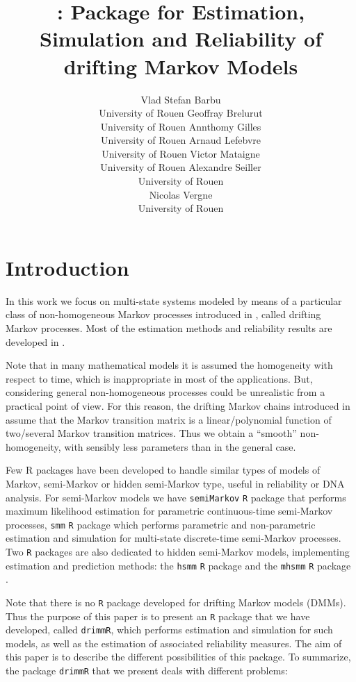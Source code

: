 \documentclass[article,nojss]{jss}\usepackage[]{graphicx}\usepackage[]{color}
\author{
Vlad Stefan Barbu\\University of Rouen \And Geoffray Brelurut\\University of Rouen \And Annthomy Gilles\\University of Rouen
\AND Arnaud Lefebvre\\University of Rouen \And Victor Mataigne \\University of Rouen \And Alexandre Seiller \\University of Rouen \\ \And Nicolas Vergne\\University of Rouen \\
}
\title{\pkg{drimmR} : \proglang{R} Package for Estimation, Simulation and Reliability of drifting Markov Models}%
\begin{document}
\section{Introduction}

In this work we focus on multi-state systems modeled by means of a particular class of non-homogeneous Markov processes introduced in \citet{Ver08}, called drifting Markov processes. Most of the estimation methods and reliability results are developed in \cite{BaVe2018}.

Note that in many mathematical models it is assumed the homogeneity with respect to time, which is inappropriate in most of the applications. But, considering general non-homogeneous processes could be unrealistic from a practical point of view. For this reason, the drifting Markov chains introduced in  \cite{Ver08} assume that the Markov transition matrix is a linear/polynomial function of two/several Markov transition matrices.  Thus we obtain  a ``smooth'' non-homogeneity, with sensibly less parameters than in the general case.

Few R packages have been developed to handle similar types of models of Markov, semi-Markov or hidden semi-Markov type, useful in reliability or DNA analysis. For semi-Markov models we have {\tt semiMarkov} {\tt R} package \cite{krol_semimarkov_2015} that performs maximum likelihood estimation for parametric continuous-time semi-Markov processes, {\tt smm}  {\tt R} package \cite{BaBeCeSaVe} which performs parametric and non-parametric estimation and simulation for multi-state discrete-time semi-Markov processes. Two  {\tt R} packages are also dedicated to hidden semi-Markov models, implementing estimation and prediction methods: the {\tt hsmm} {\tt R} package \cite{bulla_hsmm_2010} and  the {\tt mhsmm}  {\tt R} package \citet{oconnell_hidden_2011}.

Note that there is no {\tt R} package  developed for drifting Markov models (DMMs). Thus the purpose of this paper is to present an {\tt R} package that we have developed, called {\tt drimmR}, which performs estimation and simulation for such models, as well as the estimation of associated reliability measures. The aim of this paper is to describe the different possibilities of this package. To summarize, the package {\tt drimmR} that we present deals with different problems:
\end{document}
